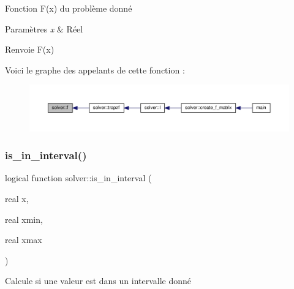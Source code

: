 Fonction F(x) du problème donné 


\begin{DoxyParams}{Paramètres}
{\em x} & Réel \\
\hline
\end{DoxyParams}
\begin{DoxyReturn}{Renvoie}
F(x) 
\end{DoxyReturn}
Voici le graphe des appelants de cette fonction \+:
\nopagebreak
\begin{figure}[H]
\begin{center}
\leavevmode
\includegraphics[width=350pt]{namespacesolver_a6f4d43c88c7c8ebdea64bd45e002af05_icgraph}
\end{center}
\end{figure}
\mbox{\label{namespacesolver_a2380e35eaa6fcef040f90bb5b23baa6a}} 
\subsubsection{\texorpdfstring{is\+\_\+in\+\_\+interval()}{is\_in\_interval()}}
{\footnotesize\ttfamily logical function solver\+::is\+\_\+in\+\_\+interval (\begin{DoxyParamCaption}\item[{real}]{x,  }\item[{real}]{xmin,  }\item[{real}]{xmax }\end{DoxyParamCaption})}



Calcule si une valeur est dans un intervalle donné 


